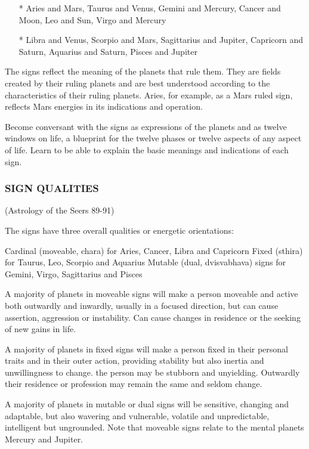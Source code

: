 \begin{enumerate}
\item[*] Aries and Mars, Taurus and Venus, Gemini and Mercury, Cancer and Moon, Leo and Sun, Virgo and Mercury
\item[*] Libra and Venus, Scorpio and Mars, Sagittarius and Jupiter, Capricorn and Saturn, Aquarius and Saturn, Pisces and Jupiter
 \end{enumerate}

The signs reflect the meaning of the planets that rule them. They are fields created by their ruling planets and are best understood according to the characteristics of their ruling planets. Aries, for example, as a Mars ruled sign, reflects Mars energies in its indications and operation.

Become conversant with the signs as expressions of the planets and as twelve windows on life, a blueprint for the twelve phases or twelve aspects of any aspect of life. Learn to be able to explain the basic meanings and indications of each sign.

 

\subsubsection{SIGN QUALITIES }(Astrology of the Seers 89-91)

 

The signs have three overall qualities or energetic orientations:

 

Cardinal (moveable, chara) for Aries, Cancer, Libra and Capricorn
Fixed (sthira) for Taurus, Leo, Scorpio and Aquarius
Mutable (dual, dvisvabhava) signs for Gemini, Virgo, Sagittarius and Pisces
 

A majority of planets in moveable signs will make a person moveable and active both outwardly and inwardly, usually in a focused direction, but can cause assertion, aggression or instability. Can cause changes in residence or the seeking of new gains in life.

A majority of planets in fixed signs will make a person fixed in their personal traits and in their outer action, providing stability but also inertia and unwillingness to change. the person may be stubborn and unyielding. Outwardly their residence or profession may remain the same and seldom change.

A majority of planets in mutable or dual signs will be sensitive, changing and adaptable, but also wavering and vulnerable, volatile and unpredictable, intelligent but ungrounded. Note that moveable signs relate to the mental planets Mercury and Jupiter.

